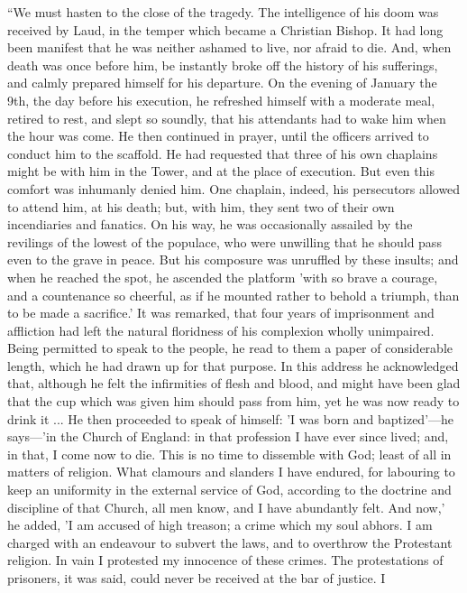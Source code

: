 ``We must hasten to the close of the
tragedy. The intelligence of his doom was received by Laud, in the
temper which became a Christian Bishop. It had long been manifest that
he was neither ashamed to live, nor afraid to die. And, when death was
once before him, be instantly broke off the history of his sufferings,
and calmly prepared himself for his departure. On the evening of January
the 9th, the day before his execution, he refreshed himself with a
moderate meal, retired to rest, and slept so soundly, that his
attendants had to wake him when the hour was come. He then continued in
prayer, until the officers arrived to conduct him to the scaffold. He
had requested that three of his own chaplains might be with him in the
Tower, and at the place of execution. But even this comfort was
inhumanly denied him. One chaplain, indeed, his persecutors allowed to
attend him, at his death; but, with him, they sent two of their own
incendiaries and fanatics. On his way, he was occasionally assailed by
the revilings of the lowest of the populace, who
were unwilling that he should pass even to the grave in peace. But his
composure was unruffled by these insults; and when he reached the spot,
he ascended the platform 'with so brave a courage, and a countenance so
cheerful, as if he mounted rather to behold a triumph, than to be made a
sacrifice.' It was remarked, that four years of imprisonment and
affliction had left the natural floridness of his complexion wholly
unimpaired. Being permitted to speak to the people, he read to them a
paper of considerable length, which he had drawn up for that purpose. In
this address he acknowledged that, although he felt the infirmities of
flesh and blood, and might have been glad that the cup which was given
him should pass from him, yet he was now ready to drink it ... He then
proceeded to speak of himself: 'I was born and baptized'—he says—'in
the Church of England: in that profession I have ever since lived; and,
in that, I come now to die. This is no time to dissemble with God; least
of all in matters of religion. What clamours and slanders I have
endured, for labouring to keep an uniformity in the external service of
God, according to the doctrine and discipline of that Church, all men
know, and I have abundantly felt. And now,' he added, 'I am accused of
high treason; a crime which my soul abhors. I am charged with an
endeavour to subvert the laws, and to overthrow the Protestant religion.
In vain I protested my innocence of these crimes. The protestations of
prisoners, it was said, could never be received at the bar of justice. I
